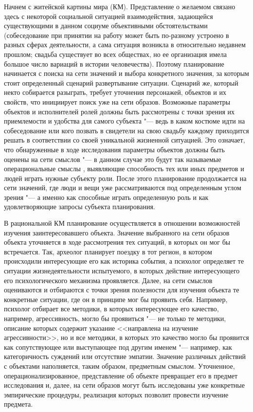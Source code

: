 \documentclass[a4paper, 12pt]{article}
\theoremstyle{break}
\numberwithin{equation}{section}
\begin{document}
	Начнем с житейской картины мира (КМ). Представление о желаемом связано здесь с некоторой социальной ситуацией взаимодействия, задающейся существующими в данном социуме объективными обстоятельствами (собеседование при принятии на работу может быть по-разному устроено в разных сферах деятельности, а сама ситуация возникла в относительно недавнем прошлом; свадьба существует во всех обществах, но ее организация имела большое число вариаций в истории человечества). Поэтому планирование начинается с поиска на сети значений и выбора конкретного значения, за которым стоит определенный сценарий развертывание ситуации. Сценарий же, который некто собирается разыграть, требует уточнения персонажей, объектов и их свойств, что инициирует поиск уже на сети образов. Возможные параметры объектов и исполнителей ролей должны быть рассмотрены с точки зрения их приемлемости и удобства для самого субъекта "--- ведь в каком костюме идти на собеседование или кого позвать в свидетели на свою свадьбу каждому приходится решать в соответствии со своей уникальной жизненной ситуацией. Это означает, что обнаруженные в ходе исследования параметры объектов должны быть оценены на сети смыслов "--- в данном случае это будут так называемые операциональные смыслы \cite{Tikhomirov2002}, выявляющие способность тех или иных предметов и людей играть нужные субъекту роли. После этого планирование продолжается на сети значений, где люди и вещи уже рассматриваются под определенным углом зрения "--- а именно как способные играть определенную роль и как удовлетворяющие запросы субъекта планирования.
	
	В рациональной КМ планирование осуществляется в отношении возможностей изучения заинтересовавшего объекта. Значение выбранного на сети образов объекта уточняется в ходе рассмотрения тех ситуаций, в которых он мог бы встречается. Так, археолог планирует поездку в тот регион, в котором происходили интересующие его как историка события, а психолог определяет те ситуации жизнедеятельности испытуемого, в которых действие интересующего его психологического механизма проявляется. Далее, на сети смыслов оцениваются и отбираются с точки зрения полезности для изучения объекта те конкретные ситуации, где он в принципе мог бы проявить себя. Например, психолог отбирает все методики, в которых интересующее его качество, например, агрессивность, могло бы проявиться "--- не только те методики, описание которых содержит указание <<направлена на изучение агрессивности>>, но и все методики, в которых это качество могло бы проявится как сопутствующее или выступающее под другим именем "--- например, как категоричность суждений или отсутствие эмпатии. Значение различных действий с объектами наполняется, таким образом, предметным смыслом. Уточненное, операционализированное, представление об объекте превращает его в предмет исследования и, далее, на сети образов могут быть исследованы уже конкретные эмпирические процедуры, реализация которых позволит провести изучение предмета.
	
\end{document}
